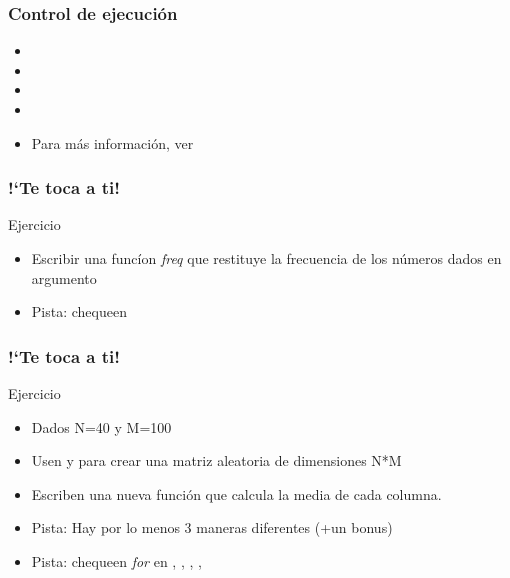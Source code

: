 \documentclass[mathserif]{beamer}
\begin{document}
\begin{frame}[plain,label=d32]%
\frametitle{Control de ejecuci\'on}
\begin{itemize}
\item {}
\item {}
\item {}
\item {}
\item Para m\'as informaci\'on, ver 
\end{itemize}
\end{frame}%

\begin{frame}[plain,label=d33]%
\frametitle{!`Te toca a ti!}
\begin{exampleblock}{Ejercicio}
\begin{itemize}
   \item Escribir una func\'ion \emph{freq} que restituye la frecuencia de los n\'umeros dados en argumento
   \item \alert{Pista}: chequeen 
\end{itemize}
\end{exampleblock}
\end{frame}%

\begin{frame}[plain,label=d34]%
\frametitle{!`Te toca a ti!}
\begin{exampleblock}{Ejercicio}
\begin{itemize}
\item Dados N=40 y M=100
   \item Usen  y  para crear una matriz aleatoria de dimensiones N*M
   \item Escriben una nueva funci\'on que calcula la media de cada columna.
   \item \alert{Pista}: Hay por lo menos 3 maneras diferentes (+un bonus)
   \item \alert{Pista}: chequeen \emph{for} en , , , , 
\end{itemize}
\end{exampleblock}
\end{frame}%
\end{document}
